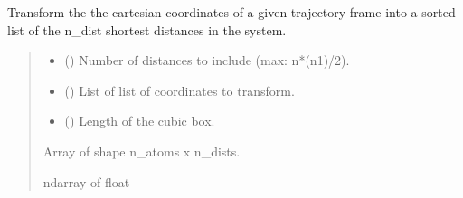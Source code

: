 \documentclass[a4paper,10pt,english]{report}
\begin{document}
\begin{fulllineitems}
\label{\detokenize{NNucleate:NNucleate.data_augmentation.transform_frame_to_ndist_list}}
\pysigstartsignatures
{}
\pysigstopsignatures
\sphinxAtStartPar
Transform the the cartesian coordinates of a given trajectory frame into a sorted list of the n\_dist shortest distances in the system.
\begin{quote}\begin{description}
\begin{itemize}
\item {} 
\sphinxAtStartPar
{} () \textendash{} Number of distances to include (max: n*(n\sphinxhyphen{}1)/2).

\item {} 
\sphinxAtStartPar
{} () \textendash{} List of list of coordinates to transform.

\item {} 
\sphinxAtStartPar
{} () \textendash{} Length of the cubic box.

\end{itemize}

\sphinxAtStartPar
Array of shape n\_atoms x n\_dists.

\sphinxAtStartPar
ndarray of float

\end{description}\end{quote}

\end{fulllineitems}

\end{document}
